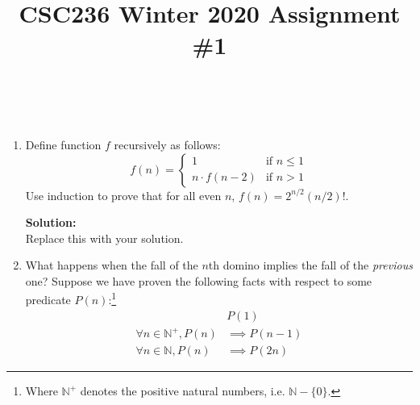 \documentclass[boldsans]{article}
\title{CSC236 Winter 2020 Assignment \#1}
\author{\name \\ \textit{\utorid}}
\newcommand{\N}{\mathbb{N}}
\newenvironment{solution}
{\bigskip \noindent \textbf{Solution: \\}}
{}
\begin{document}
\maketitle

\begin{enumerate}

\item Define function $f$ recursively as follows:
\begin{equation*}
    f(n) =
    \begin{cases}
      1 & \text{if } n \leq 1 \\
      n \cdot f(n-2) & \text{if } n > 1
    \end{cases}
  \end{equation*}
Use induction to prove that for all even $n$, $f(n) = 2^{n/2} (n/2)!$.

\begin{solution}
Replace this with your solution.
\end{solution}

\newpage
\item What happens when the fall of the $n$th domino implies the fall of the \textit{previous} one? Suppose we have proven the following facts with respect to some predicate $P(n)$:\footnote{Where $\N^+$ denotes the positive natural numbers, i.e. $\N - \{0\}$.}
\begin{align}
    &P(1) \label{basis} \\
    \forall n \in \N^+, P(n) &\implies P(n-1) \label{back}\\
    \forall n \in \N, P(n) &\implies P(2n) \label{double}
\end{align}


\end{enumerate}
\end{document}
